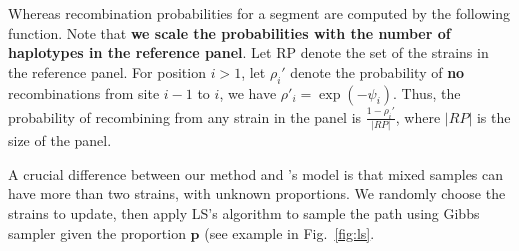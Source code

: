 \documentclass{bioinfo}
\begin{document}
\begin{methods}
Whereas recombination probabilities for a segment are computed by the following function. Note that {\bf we scale the probabilities with the number of haplotypes in the reference panel}. Let $\textrm{RP}$ denote the set of the strains in the reference panel. For position $i > 1$, let $\rho_i'$ denote the probability of {\bf no} recombinations from site $i-1$ to $i$, we have $\rho'_i = \exp(-\psi_i)$. Thus, the probability of recombining from any strain in the panel is $\displaystyle\frac{1-\rho_i'}{|RP|}$, where $|RP|$ is the size of the panel.


A crucial difference between our method and \citet{Li2003}'s model is that mixed samples can have more than two strains, with unknown proportions. We randomly choose the strains to update, then apply LS's algorithm to sample the path using Gibbs sampler given the proportion $\mathbf p$ (see example in Fig.~\ref{fig:ls}.


\end{methods}
\end{document}
